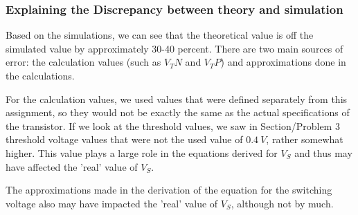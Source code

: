 \documentclass[12pt]{article}
\begin{document}
\subsubsection{Explaining the Discrepancy between theory and simulation}
Based on the simulations, we can see that the theoretical value is off the simulated value by approximately 30-40 percent. There are two main sources
of error: the calculation values (such as $V_TN$ and $V_TP$) and approximations done in the calculations.

For the calculation values, we used values that were defined separately from this assignment, so they would not be exactly the same as the actual 
specifications of the transistor. If we look at the threshold values, we saw in Section/Problem 3 threshold voltage values that were not the used value of
$\SI{0.4}{V}$, rather somewhat higher. This value plays a large role in the equations derived for $V_S$ and thus may have affected the 'real' value of 
$V_S$.

The approximations made in the derivation of the equation for the switching voltage also may have impacted the 'real' value of $V_S$, although not by
much.
\pagebreak
\end{document}
